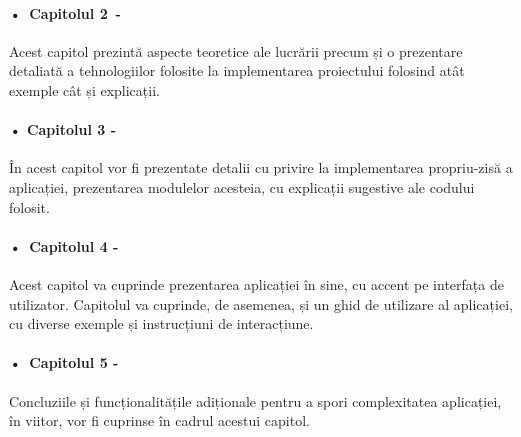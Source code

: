 \paragraph{•\, Capitolul 2\, -}Acest capitol prezintă aspecte teoretice ale lucrării precum și o prezentare detaliată a tehnologiilor folosite la implementarea proiectului folosind  atât exemple cât și explicații.

\paragraph{• Capitolul 3 -}În acest capitol vor fi prezentate detalii cu privire la implementarea propriu-zisă a aplicației, prezentarea modulelor acesteia, cu explicații sugestive ale codului folosit.

\paragraph{•\, Capitolul 4 -}Acest capitol va cuprinde prezentarea aplicației în sine, cu accent pe interfața de utilizator. Capitolul va cuprinde, de asemenea, și un ghid de utilizare al aplicației, cu diverse exemple și instrucțiuni de interacțiune.

\paragraph{•\, Capitolul 5 -}Concluziile și funcționalitățile adiționale pentru a spori complexitatea aplicației, în viitor, vor fi cuprinse în cadrul acestui capitol.

\label{chap:01}


